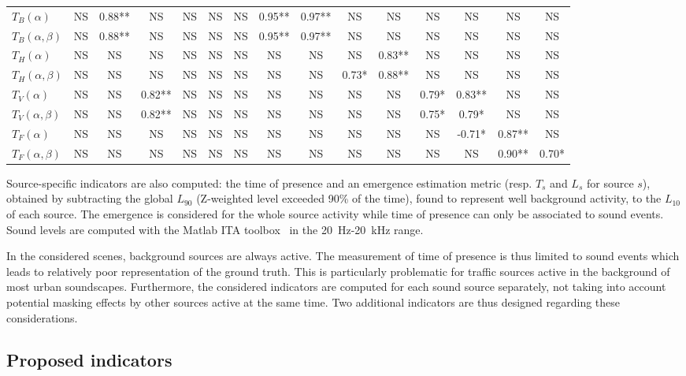\documentclass{article}
\begin{document}
\begin{sloppy}
\begin{table}[ht!]
{\begin{tabular}{ l | c c c c c c c c c c c c c c }
	$T_B(\alpha)$ & NS & 0.88** & NS & NS & NS & NS & 0.95** & 0.97** & NS & NS & NS & NS & NS & NS \\
	$T_B(\alpha, \beta)$ & NS & 0.88** & NS & NS & NS & NS & 0.95** & 0.97** & NS & NS & NS & NS & NS & NS \\ \hline
	$T_H(\alpha)$ & NS & NS & NS & NS & NS & NS & NS & NS & NS & 0.83** & NS & NS & NS & NS \\
	$T_H(\alpha, \beta)$ & NS & NS & NS & NS & NS & NS & NS & NS & 0.73* & 0.88** & NS & NS & NS & NS \\ \hline
	$T_V(\alpha)$ & NS & NS & 0.82** & NS & NS & NS & NS & NS & NS & NS & 0.79* & 0.83** & NS & NS \\
	$T_V(\alpha, \beta)$ & NS & NS & 0.82** & NS & NS & NS & NS & NS & NS & NS & 0.75* & 0.79* & NS & NS \\ \hline
	$T_F(\alpha)$ & NS & NS & NS & NS & NS & NS & NS & NS & NS & NS & NS & -0.71* & 0.87** & NS \\
	$T_F(\alpha, \beta)$ & NS & NS & NS & NS & NS & NS & NS & NS & NS & NS & NS & NS & 0.90** & 0.70* \\ \hline
\end{tabular}
}
\end{table}

Source-specific indicators are also computed: the time of presence and an emergence estimation metric (resp. $T_s$ and $L_s$ for source $s$), obtained by subtracting the global $L_{90}$ (Z-weighted level exceeded 90\% of the time), found to represent well background activity, to the $L_{10}$ of each source. The emergence is considered for the whole source activity while time of presence can only be associated to sound events. Sound levels are computed with the Matlab ITA toolbox~\cite{itatoolbox2017} in the 20~Hz-20~kHz range.

In the considered scenes, background sources are always active. The measurement of time of presence is thus limited to sound events which leads to relatively poor representation of the ground truth. This is particularly problematic for traffic sources active in the background of most urban soundscapes. Furthermore, the considered indicators are computed for each sound source separately, not taking into account potential masking effects by other sources active at the same time. Two additional indicators are thus designed regarding these considerations.

\subsection{Proposed indicators}



\end{sloppy}
\end{document}
